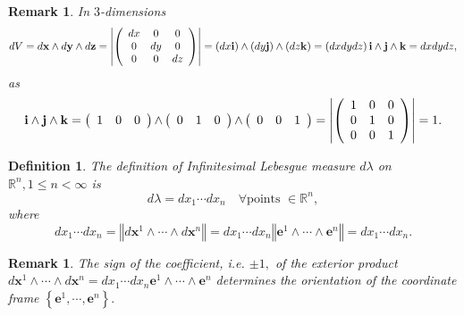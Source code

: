\documentclass[aps,preprint]{revtex4}%
\newtheorem{definition}[theorem]{Definition}
\newtheorem{remark}[theorem]{Remark}
\begin{document}
\begin{remark}
In $3$-dimensions
\begin{equation}
dV=d\mathbf{x}\wedge d\mathbf{y}\wedge d\mathbf{z}=\left\vert \left(
\begin{array}
[c]{ccc}%
dx & 0 & 0\\
0 & dy & 0\\
0 & 0 & dz
\end{array}
\right)  \right\vert =\left(  dx\mathbf{i}\right)  \wedge\left(
dy\mathbf{j}\right)  \wedge\left(  dz\mathbf{k}\right)  =\left(
dxdydz\right)  \mathbf{i}\wedge\mathbf{j}\wedge\mathbf{k}=dxdydz,
\end{equation}
as
\begin{equation}
\mathbf{i}\wedge\mathbf{j}\wedge\mathbf{k}=\left(  \mathbf{%
\begin{array}
[c]{ccc}%
1 & 0 & 0
\end{array}
}\right)  \mathbf{\wedge}\left(  \mathbf{%
\begin{array}
[c]{ccc}%
0 & 1 & 0
\end{array}
}\right)  \mathbf{\wedge}\left(  \mathbf{%
\begin{array}
[c]{ccc}%
0 & 0 & 1
\end{array}
}\right)  =\left\vert \left(
\begin{array}
[c]{ccc}%
1 & 0 & 0\\
0 & 1 & 0\\
0 & 0 & 1
\end{array}
\right)  \right\vert =1.
\end{equation}

\end{remark}

\begin{definition}
The \emph{definition} of \emph{Infinitesimal Lebesgue} measure $d\lambda$ on
$\mathbb{R}^{n},1\leq n<\infty$ is
\begin{equation}
d\lambda=dx_{1}\cdots dx_{n}\quad\forall\text{points }\mathbf{\in}%
\mathbb{R}^{n},
\end{equation}
where
\begin{equation}
dx_{1}\cdots dx_{n}=\left\Vert d\mathbf{x}^{1}\wedge\cdots\wedge
d\mathbf{x}^{n}\right\Vert =dx_{1}\cdots dx_{n}\left\Vert \mathbf{e}^{1}%
\wedge\cdots\wedge\mathbf{e}^{n}\right\Vert =dx_{1}\cdots dx_{n}.
\end{equation}

\end{definition}

\begin{remark}
The sign of the coefficient, i.e. $\pm1,$ of the exterior product
$d\mathbf{x}^{1}\wedge\cdots\wedge d\mathbf{x}^{n}=dx_{1}\cdots dx_{n}%
\mathbf{e}^{1}\wedge\cdots\wedge\mathbf{e}^{n}$ determines the
\emph{orientation} of the coordinate frame $\left\{  \mathbf{e}^{1}%
,\cdots,\mathbf{e}^{n}\right\}  .$
\end{remark}
\end{document}
